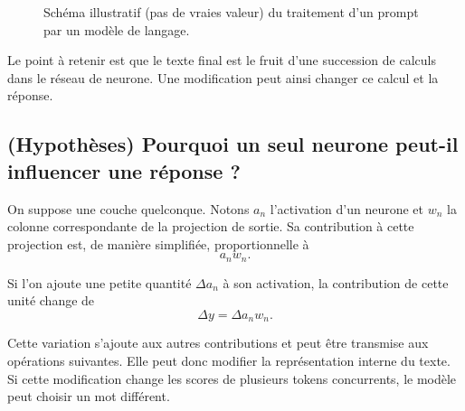 \documentclass[11pt,a4paper]{article}
\begin{document}
\begin{figure}[htbp]
{}


\caption{Schéma illustratif (pas de vraies valeur) du traitement d'un prompt par un modèle de langage.}
\label{fig:architecture}
\end{figure}

Le point à retenir est que le texte final est le fruit d'une succession de calculs dans le réseau de neurone. Une modification peut ainsi changer ce calcul et la réponse.


\subsection{(Hypothèses) Pourquoi un seul neurone peut-il influencer une réponse ?  }

On suppose une couche quelconque. Notons \(a_n\) l'activation d'un neurone et \(w_n\) la colonne correspondante de la projection de sortie. Sa contribution à cette projection est, de manière simplifiée, proportionnelle à
\[
    a_n w_n.
\]

Si l'on ajoute une petite quantité \(\Delta a_n\) à son activation, la contribution de cette unité change de
\[
    \Delta y = \Delta a_n w_n.
\]

Cette variation s'ajoute aux autres contributions et peut être transmise aux opérations suivantes. Elle peut donc modifier la représentation interne du texte. Si cette modification change les scores de plusieurs tokens concurrents, le modèle peut choisir un mot différent. 
\end{document}
